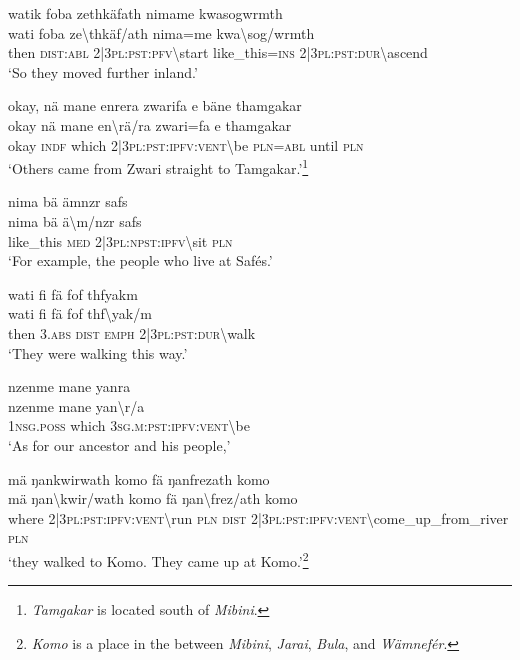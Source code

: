 \ea\label{ex:1:a3624}
watik foba zethkäfath nimame kwasogwrmth\\
\gll wati	foba	ze{\textbackslash}thkäf/ath	nima=me	kwa{\textbackslash}sog/wrmth\\
     then	\textsc{dist}:\textsc{abl}	2|3\textsc{pl}:\textsc{pst}:\textsc{pfv}{\textbackslash}start	like\_this=\textsc{ins}	2|3\textsc{pl}:\textsc{pst}:\textsc{dur}{\textbackslash}ascend\\
\glt `So they moved further inland.'
\z

\ea\label{ex:1:a3625}
okay, nä mane enrera zwarifa e bäne thamgakar\\
\gll okay	nä	mane	en{\textbackslash}rä/ra	zwari=fa	e	thamgakar\\
     okay	\textsc{indf}	which	2|3\textsc{pl}:\textsc{pst}:\textsc{ipfv}:\textsc{vent}{\textbackslash}be	\textsc{pln}=\textsc{abl}	until	\textsc{pln}\\
\glt `Others came from Zwari straight to Tamgakar.'\footnote{\textit{Tamgakar} is located south of \textit{Mibini}.}
\z

\ea\label{ex:1:a3629}
nima bä ämnzr safs\\
\gll nima	bä	ä{\textbackslash}m/nzr	safs\\
     like\_this	\textsc{med}	2|3\textsc{pl}:\textsc{npst}:\textsc{ipfv}{\textbackslash}sit	\textsc{pln}\\
\glt `For example, the people who live at Safés.'
\z

\ea\label{ex:1:a3630}
wati fi fä fof thfyakm\\
\gll wati	fi	fä	fof	thf{\textbackslash}yak/m\\
     then	3.\textsc{abs}	\textsc{dist}	\textsc{emph}	2|3\textsc{pl}:\textsc{pst}:\textsc{dur}{\textbackslash}walk\\
\glt `They were walking this way.'
\z

\ea\label{ex:1:a3631}
nzenme mane yanra\\
\gll nzenme	mane	yan{\textbackslash}r/a\\
     1\textsc{nsg}.\textsc{poss}	which	3\textsc{sg}.\textsc{m}:\textsc{pst}:\textsc{ipfv}:\textsc{vent}{\textbackslash}be\\
\glt `As for our ancestor and his people,'
\z

\ea\label{ex:1:a3632}
mä ŋankwirwath komo fä ŋanfrezath komo\\
\gll mä	ŋan{\textbackslash}kwir/wath	komo	fä	ŋan{\textbackslash}frez/ath	komo\\
     where	2|3\textsc{pl}:\textsc{pst}:\textsc{ipfv}:\textsc{vent}{\textbackslash}run	\textsc{pln}	\textsc{dist}	2|3\textsc{pl}:\textsc{pst}:\textsc{ipfv}:\textsc{vent}{\textbackslash}come\_up\_from\_river	\textsc{pln}\\
\glt `they walked to Komo. They came up at Komo.'\footnote{\textit{Komo} is a place in the between \textit{Mibini}, \textit{Jarai}, \textit{Bula}, and \textit{Wämnefér}.}
\z

